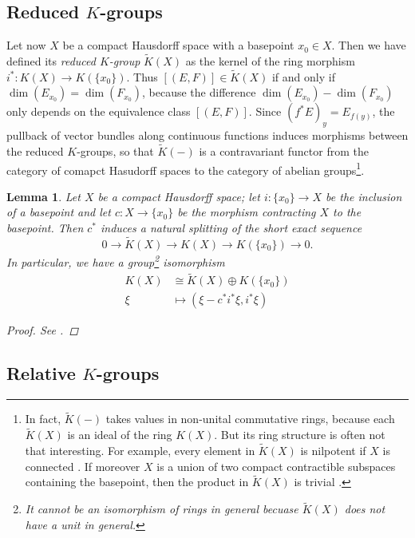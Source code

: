 \documentclass[12pt,a4paper]{amsart}
\theoremstyle{plain}
\newtheorem{lm}[thm]{Lemma}
\theoremstyle{definition}
\theoremstyle{remark}
\begin{document}
\subsection{Reduced $K$-groups}

Let now $X$ be a compact Hausdorff space with a basepoint $x_{0} \in X$.
Then we have defined its \textit{reduced $K$-group} $\tilde{K}(X)$ as the kernel of the ring morphism $i^{*} \colon K(X) \to K(\{ x_{0} \})$.
Thus $[(E,F)]\in \tilde{K}(X)$ if and only if $\dim(E_{x_{0}}) = \dim(F_{x_{0}})$, because the difference $\dim(E_{x_{0}}) - \dim(F_{x_{0}})$ only depends on the equivalence class $[(E,F)]$.
Since $(f^{*}E)_{y} = E_{f(y)}$, the pullback of vector bundles along continuous functions induces morphisms between the reduced $K$-groups, so that $\tilde{K}(-)$ is a contravariant functor from the category of comapct Hasudorff spaces to the category of abelian groups\footnote{In fact, $\tilde{K}(-)$ takes values in non-unital commutative rings, because each $\tilde{K}(X)$ is an ideal of the ring $K(X)$.
But its ring structure is often not that interesting.
For example, every element in $\tilde{K}(X)$ is nilpotent if $X$ is connected \cite[II.5.9]{kar78}.
If moreover $X$ is a union of two compact contractible subspaces containing the basepoint, then the product in $\tilde{K}(X)$ is trivial \cite[Example 2.13]{hat03}.}.

\begin{lm}
  Let $X$ be a compact Hausdorff space; let $i \colon \{ x_{0} \} \to X$ be the inclusion of a basepoint and let $c \colon X \to \{ x_{0} \}$ be the morphism contracting $X$ to the basepoint.
  Then $c^{*}$ induces a natural splitting of the short exact sequence
  \[ 0 \to \tilde{K}(X) \to K(X) \to K(\{ x_{0}\}) \to 0. \]
  In particular, we have a group\footnote{It cannot be an isomorphism of rings in general becuase $\tilde{K}(X)$ does not have a unit in general.} isomorphism
  \begin{align*}
    K(X) & \cong \tilde{K}(X) \oplus K(\{ x_{0} \}) \\
    \xi & \mapsto (\xi - c^{*}i^{*}\xi, i^{*}\xi)
  \end{align*}
  \begin{proof}
    See \cite[p.~66]{ati67}.
  \end{proof}
\end{lm}

\subsection{Relative $K$-groups}
\end{document}
